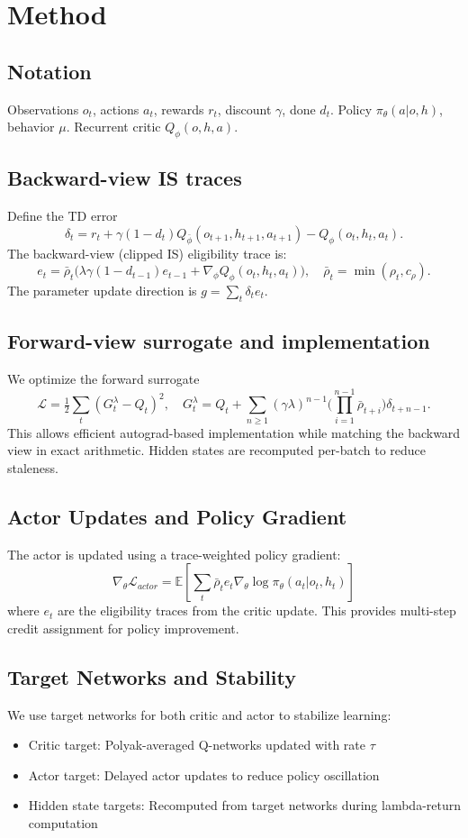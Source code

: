 \documentclass{article}
\begin{document}
\section{Method}
\subsection{Notation}
Observations \(o_t\), actions \(a_t\), rewards \(r_t\), discount \(\gamma\), done \(d_t\).
Policy \(\pi_\theta(a|o,h)\), behavior \(\mu\). Recurrent critic \(Q_\phi(o,h,a)\).

\subsection{Backward-view IS traces}
Define the TD error
\[
\delta_t = r_t + \gamma(1-d_t) Q_{\bar\phi}(o_{t+1},h_{t+1},a_{t+1}) - Q_\phi(o_t,h_t,a_t).
\]
The backward-view (clipped IS) eligibility trace is:
\[
e_t = \bar{\rho}_t\big(\lambda\gamma(1-d_{t-1})e_{t-1} + \nabla_\phi Q_\phi(o_t,h_t,a_t)\big),
\quad \bar{\rho}_t = \min(\rho_t, c_\rho).
\]
The parameter update direction is \(g=\sum_t \delta_t e_t\).

\subsection{Forward-view surrogate and implementation}
We optimize the forward surrogate
\[
\mathcal{L}=\tfrac12\sum_t (G_t^\lambda - Q_t)^2,\quad
G_t^\lambda = Q_t + \sum_{n\ge1} (\gamma\lambda)^{n-1}\Big(\prod_{i=1}^{n-1}\bar{\rho}_{t+i}\Big)\delta_{t+n-1}.
\]
This allows efficient autograd-based implementation while matching the backward view
in exact arithmetic. Hidden states are recomputed per-batch to reduce staleness.

\subsection{Actor Updates and Policy Gradient}
The actor is updated using a trace-weighted policy gradient:
\[
\nabla_\theta \mathcal{L}_{actor} = \mathbb{E} \left[ \sum_t \bar{\rho}_t e_t \nabla_\theta \log \pi_\theta(a_t|o_t,h_t) \right]
\]
where \(e_t\) are the eligibility traces from the critic update. This provides multi-step
credit assignment for policy improvement.

\subsection{Target Networks and Stability}
We use target networks for both critic and actor to stabilize learning:
\begin{itemize}
  \item Critic target: Polyak-averaged Q-networks updated with rate \(\tau\)
  \item Actor target: Delayed actor updates to reduce policy oscillation
  \item Hidden state targets: Recomputed from target networks during lambda-return computation
\end{itemize}
\end{document}
